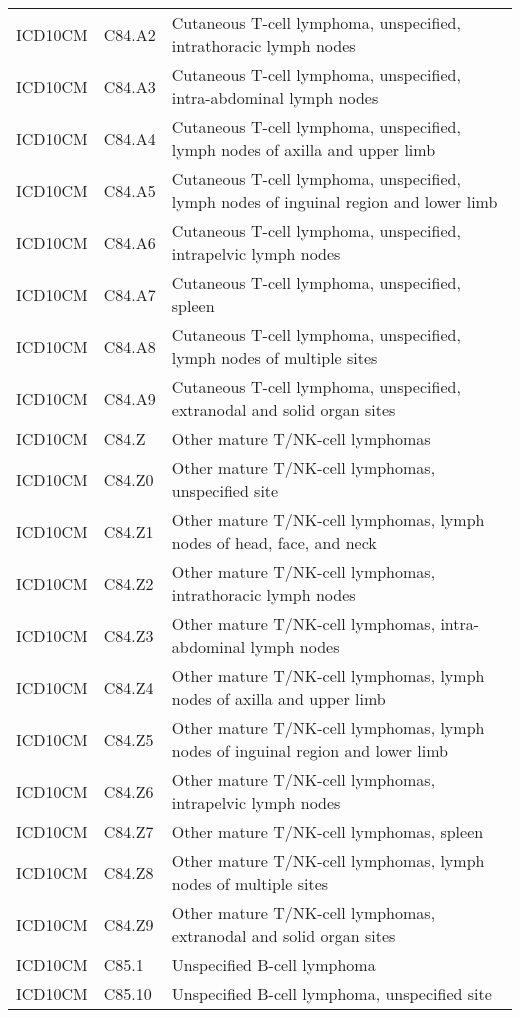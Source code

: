 \begin{longtable}{p{}p{}p{}}
  ICD10CM & C84.A2 & Cutaneous T-cell lymphoma, unspecified, intrathoracic lymph nodes \\ 
  ICD10CM & C84.A3 & Cutaneous T-cell lymphoma, unspecified, intra-abdominal lymph nodes \\ 
  ICD10CM & C84.A4 & Cutaneous T-cell lymphoma, unspecified, lymph nodes of axilla and upper limb \\ 
  ICD10CM & C84.A5 & Cutaneous T-cell lymphoma, unspecified, lymph nodes of inguinal region and lower limb \\ 
  ICD10CM & C84.A6 & Cutaneous T-cell lymphoma, unspecified, intrapelvic lymph nodes \\ 
  ICD10CM & C84.A7 & Cutaneous T-cell lymphoma, unspecified, spleen \\ 
  ICD10CM & C84.A8 & Cutaneous T-cell lymphoma, unspecified, lymph nodes of multiple sites \\ 
  ICD10CM & C84.A9 & Cutaneous T-cell lymphoma, unspecified, extranodal and solid organ sites \\ 
  ICD10CM & C84.Z & Other mature T/NK-cell lymphomas \\ 
  ICD10CM & C84.Z0 & Other mature T/NK-cell lymphomas, unspecified site \\ 
  ICD10CM & C84.Z1 & Other mature T/NK-cell lymphomas, lymph nodes of head, face, and neck \\ 
  ICD10CM & C84.Z2 & Other mature T/NK-cell lymphomas, intrathoracic lymph nodes \\ 
  ICD10CM & C84.Z3 & Other mature T/NK-cell lymphomas, intra-abdominal lymph nodes \\ 
  ICD10CM & C84.Z4 & Other mature T/NK-cell lymphomas, lymph nodes of axilla and upper limb \\ 
  ICD10CM & C84.Z5 & Other mature T/NK-cell lymphomas, lymph nodes of inguinal region and lower limb \\ 
  ICD10CM & C84.Z6 & Other mature T/NK-cell lymphomas, intrapelvic lymph nodes \\ 
  ICD10CM & C84.Z7 & Other mature T/NK-cell lymphomas, spleen \\ 
  ICD10CM & C84.Z8 & Other mature T/NK-cell lymphomas, lymph nodes of multiple sites \\ 
  ICD10CM & C84.Z9 & Other mature T/NK-cell lymphomas, extranodal and solid organ sites \\ 
  ICD10CM & C85.1 & Unspecified B-cell lymphoma \\ 
  ICD10CM & C85.10 & Unspecified B-cell lymphoma, unspecified site \\ 

\end{longtable}
